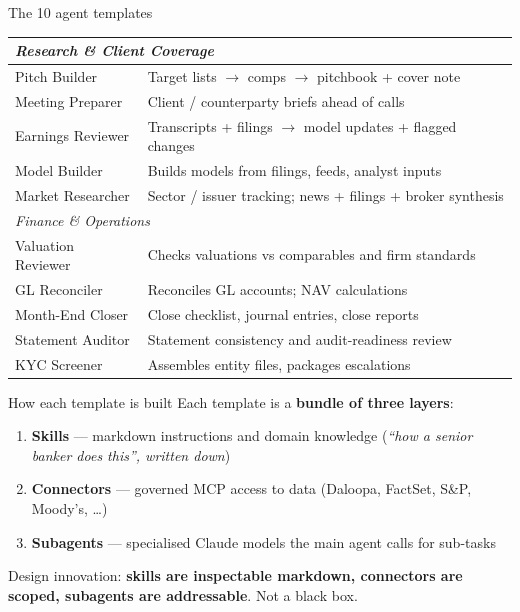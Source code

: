 \documentclass[11pt,aspectratio=169]{beamer}
\newcommand{\hl}[1]{\textbf{\textcolor{accentpurple}{#1}}}
\begin{document}
\begin{frame}{The 10 agent templates}
  \centering\footnotesize
  \begin{tabular}{lp{}}
    \toprule
    \multicolumn{2}{l}{\textit{Research \& Client Coverage}} \\
    \midrule
    Pitch Builder       & Target lists $\rightarrow$ comps $\rightarrow$ pitchbook + cover note \\
    Meeting Preparer    & Client / counterparty briefs ahead of calls \\
    Earnings Reviewer   & Transcripts + filings $\rightarrow$ model updates + flagged changes \\
    Model Builder       & Builds models from filings, feeds, analyst inputs \\
    Market Researcher   & Sector / issuer tracking; news + filings + broker synthesis \\
    \midrule
    \multicolumn{2}{l}{\textit{Finance \& Operations}} \\
    \midrule
    Valuation Reviewer  & Checks valuations vs comparables and firm standards \\
    GL Reconciler       & Reconciles GL accounts; NAV calculations \\
    Month-End Closer    & Close checklist, journal entries, close reports \\
    Statement Auditor   & Statement consistency and audit-readiness review \\
    KYC Screener        & Assembles entity files, packages escalations \\
    \bottomrule
  \end{tabular}
\end{frame}

\begin{frame}{How each template is built}
  Each template is a \hl{bundle of three layers}:

  \medskip
  \begin{enumerate}
    \item \textbf{Skills} --- markdown instructions and domain knowledge (\textit{``how a senior banker does this'', written down})
    \item \textbf{Connectors} --- governed MCP access to data (Daloopa, FactSet, S\&P, Moody's, \ldots)
    \item \textbf{Subagents} --- specialised Claude models the main agent calls for sub-tasks
  \end{enumerate}

  \vfill
  Design innovation: \hl{skills are inspectable markdown, connectors are scoped, subagents are addressable}. Not a black box.
\end{frame}
\end{document}
